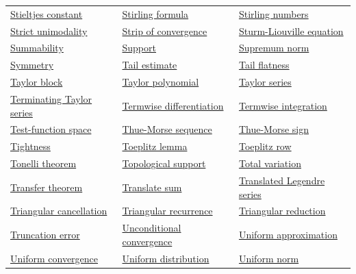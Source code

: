\documentclass[11pt,oneside]{article}
\begin{document}
\begin{longtable}{p{}p{}p{}}
\hyperlink{gls:stieltjes-constant}{Stieltjes constant} & \hyperlink{gls:stirling-formula}{Stirling formula} & \hyperlink{gls:stirling-numbers}{Stirling numbers} \\
\hyperlink{gls:strict-unimodality}{Strict unimodality} & \hyperlink{gls:strip-of-convergence}{Strip of convergence} & \hyperlink{gls:sturm-liouville-equation}{Sturm-Liouville equation} \\
\hyperlink{gls:summability}{Summability} & \hyperlink{gls:support}{Support} & \hyperlink{gls:supremum-norm}{Supremum norm} \\
\hyperlink{gls:symmetry}{Symmetry} & \hyperlink{gls:tail-estimate}{Tail estimate} & \hyperlink{gls:tail-flatness}{Tail flatness} \\
\hyperlink{gls:taylor-block}{Taylor block} & \hyperlink{gls:taylor-polynomial}{Taylor polynomial} & \hyperlink{gls:taylor-series}{Taylor series} \\
\hyperlink{gls:terminating-taylor-series}{Terminating Taylor series} & \hyperlink{gls:termwise-differentiation}{Termwise differentiation} & \hyperlink{gls:termwise-integration}{Termwise integration} \\
\hyperlink{gls:test-function-space}{Test-function space} & \hyperlink{gls:thue-morse-sequence}{Thue-Morse sequence} & \hyperlink{gls:thue-morse-sign}{Thue-Morse sign} \\
\hyperlink{gls:tightness}{Tightness} & \hyperlink{gls:toeplitz-lemma}{Toeplitz lemma} & \hyperlink{gls:toeplitz-row}{Toeplitz row} \\
\hyperlink{gls:tonelli-theorem}{Tonelli theorem} & \hyperlink{gls:topological-support}{Topological support} & \hyperlink{gls:total-variation}{Total variation} \\
\hyperlink{gls:transfer-theorem}{Transfer theorem} & \hyperlink{gls:translate-sum}{Translate sum} & \hyperlink{gls:translated-legendre-series}{Translated Legendre series} \\
\hyperlink{gls:triangular-cancellation}{Triangular cancellation} & \hyperlink{gls:triangular-recurrence}{Triangular recurrence} & \hyperlink{gls:triangular-reduction}{Triangular reduction} \\
\hyperlink{gls:truncation-error}{Truncation error} & \hyperlink{gls:unconditional-convergence}{Unconditional convergence} & \hyperlink{gls:uniform-approximation}{Uniform approximation} \\
\hyperlink{gls:uniform-convergence}{Uniform convergence} & \hyperlink{gls:uniform-distribution}{Uniform distribution} & \hyperlink{gls:uniform-norm}{Uniform norm} \\

\end{longtable}
\end{document}
